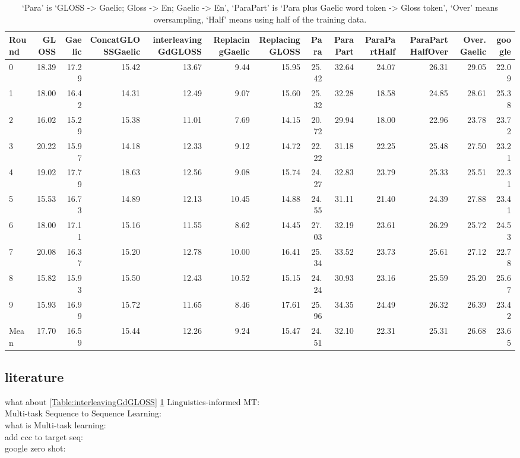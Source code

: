 \documentclass[a4paper]{article}
\begin{document}
\begin{table}[ht]
\centering
\begin{tabular}{lrrrrrrrrrrrr}
  \hline
Round & GLOSS & Gaelic & ConcatGLOSSGaelic & interleavingGdGLOSS & ReplacingGaelic & ReplacingGLOSS & Para & ParaPart & ParaPartHalf & ParaPartHalfOver & Over.Gaelic & google \\ 
  \hline
0 & 18.39 & 17.29 & 15.42 & 13.67 & 9.44 & 15.95 & 25.42 & 32.64 & 24.07 & 26.31 & 29.05 & 22.09 \\ 
  1 & 18.00 & 16.42 & 14.31 & 12.49 & 9.07 & 15.60 & 25.32 & 32.28 & 18.58 & 24.85 & 28.61 & 25.38 \\ 
  2 & 16.02 & 15.29 & 15.38 & 11.01 & 7.69 & 14.15 & 20.72 & 29.94 & 18.00 & 22.96 & 23.78 & 23.72 \\ 
  3 & 20.22 & 15.97 & 14.18 & 12.33 & 9.12 & 14.72 & 22.22 & 31.18 & 22.25 & 25.48 & 27.50 & 23.21 \\ 
  4 & 19.02 & 17.79 & 18.63 & 12.56 & 9.08 & 15.74 & 24.27 & 32.83 & 23.79 & 25.33 & 25.51 & 22.31 \\ 
  5 & 15.53 & 16.73 & 14.89 & 12.13 & 10.45 & 14.88 & 24.55 & 31.11 & 21.40 & 24.39 & 27.88 & 23.41 \\ 
  6 & 18.00 & 17.11 & 15.16 & 11.55 & 8.62 & 14.45 & 27.03 & 32.19 & 23.61 & 26.29 & 25.72 & 24.53 \\ 
  7 & 20.08 & 16.37 & 15.20 & 12.78 & 10.00 & 16.41 & 25.34 & 33.52 & 23.73 & 25.61 & 27.12 & 22.78 \\ 
  8 & 15.82 & 15.93 & 15.50 & 12.43 & 10.52 & 15.15 & 24.24 & 30.93 & 23.16 & 25.59 & 25.20 & 25.67 \\ 
  9 & 15.93 & 16.99 & 15.72 & 11.65 & 8.46 & 17.61 & 25.96 & 34.35 & 24.49 & 26.32 & 26.39 & 23.42 \\ 
   \hline
Mean & 17.70 & 16.59 & 15.44 & 12.26 & 9.24 & 15.47 & 24.51 & 32.10 & 22.31 & 25.31 & 26.68 & 23.65 \\ 
   \hline
\end{tabular}
\caption{`Para' is `GLOSS -> Gaelic; Gloss -> En; Gaelic -> En', `ParaPart' is `Para plus Gaelic word token -> Gloss token', `Over' means oversampling, `Half' means using half of the training data.} 
\label{table:complete_table}
\end{table}
\subsection{literature}

what about \ref{Table:interleavingGdGLOSS} \ref{table:complete_table}
Linguistics-informed MT: \citep{sennrich2016linguistic}\\ 

Multi-task Sequence to Sequence Learning: \citep{luong2015multi}\\
what is Multi-task learning:  \citep{Overview_Multi-Task_Learning}\\
add ccc to target seq: \citep{ccg_target_seq}\\
google zero shot: \citep{google_zero_shot}\\



\end{document}
